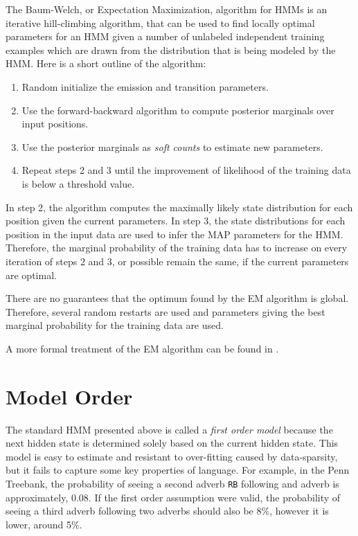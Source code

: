 The Baum-Welch, or Expectation Maximization, algorithm for HMMs is an
iterative hill-climbing algorithm, that can be used to find locally
optimal parameters for an HMM given a number of unlabeled independent
training examples which are drawn from the distribution that is being
modeled by the HMM. Here is a short outline of the algorithm:
\begin{enumerate}
\item Random initialize the emission and transition parameters.
\item Use the forward-backward algorithm to compute posterior
  marginals over input positions.
\item Use the posterior marginals as {\it soft counts} to estimate new
  parameters.
\item Repeat steps 2 and 3 until the improvement of likelihood of the
  training data is below a threshold value.
\end{enumerate}

In step 2, the algorithm computes the maximally likely state
distribution for each position given the current parameters. In step
3, the state distributions for each position in the input data are
used to infer the MAP parameters for the HMM. Therefore, the marginal
probability of the training data has to increase on every iteration of
steps 2 and 3, or possible remain the same, if the current parameters
are optimal.

There are no guarantees that the optimum found by the EM algorithm is
global. Therefore, several random restarts are used and parameters
giving the best marginal probability for the training data are used. 

A more formal treatment of the EM algorithm can be found in \cite{Blimes1997}.

\section{Model Order}

The standard HMM presented above is called a {\it first order model}
because the next hidden state is determined solely based on the
current hidden state. This model is easy to estimate and resistant to
over-fitting caused by data-sparsity, but it fails to capture some key
properties of language. For example, in the Penn Treebank, the
probability of seeing a second adverb {\tt RB} following and adverb
is approximately, 0.08. If the first order assumption were valid, the
probability of seeing a third adverb following two adverbs should also
be 8\%, however it is lower, around 5\%.

